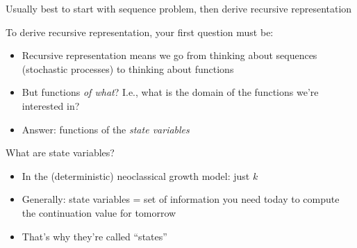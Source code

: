 \documentclass[11pt, aspectratio=169]{beamer}
\newenvironment{witemize}{\itemize\addtolength{\itemsep}{10pt}}{\enditemize}
\begin{document}
\begin{frame}{}
\begin{witemize}
\item Usually best to start with sequence problem, then derive recursive representation

\item To derive recursive representation, your first question must be:
\begin{itemize}
\item Recursive representation means we go from thinking about sequences (stochastic processes) to thinking about functions

\item But functions \textit{of what}? I.e., what is the domain of the functions we're interested in?

\item Answer: functions of the \textit{state variables}
\end{itemize}

\item What are state variables?
\begin{itemize}
\item In the (deterministic) neoclassical growth model: just $k$

\item Generally: state variables = set of information you need today to compute the continuation value for tomorrow

\item That's why they're called ``states''
\end{itemize}

\end{witemize}
\end{frame}
\end{document}
